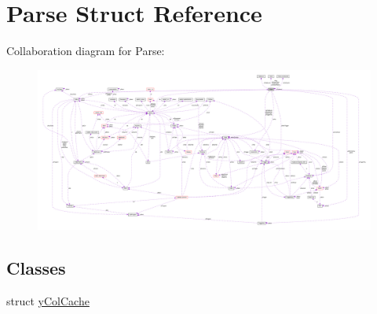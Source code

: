 \hypertarget{structParse}{}\section{Parse Struct Reference}
\label{structParse}


Collaboration diagram for Parse\+:\nopagebreak
\begin{figure}[H]
\begin{center}
\leavevmode
\includegraphics[width=350pt]{structParse__coll__graph}
\end{center}
\end{figure}
\subsection*{Classes}
\begin{DoxyCompactItemize}
\item 
struct \hyperlink{structParse_1_1yColCache}{y\+Col\+Cache}
\end{DoxyCompactItemize}
